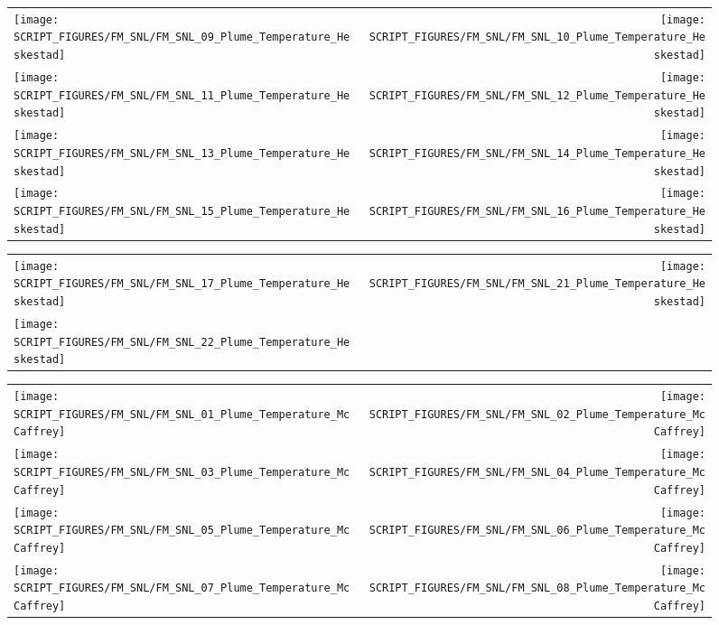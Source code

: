 \begin{figure}[!ht]
\begin{tabular*}{\textwidth}{l@{\extracolsep{\fill}}r}
\texttt{[image: SCRIPT\_FIGURES/FM\_SNL/FM\_SNL\_09\_Plume\_Temperature\_Heskestad]} &
\texttt{[image: SCRIPT\_FIGURES/FM\_SNL/FM\_SNL\_10\_Plume\_Temperature\_Heskestad]} \\
\texttt{[image: SCRIPT\_FIGURES/FM\_SNL/FM\_SNL\_11\_Plume\_Temperature\_Heskestad]} &
\texttt{[image: SCRIPT\_FIGURES/FM\_SNL/FM\_SNL\_12\_Plume\_Temperature\_Heskestad]} \\
\texttt{[image: SCRIPT\_FIGURES/FM\_SNL/FM\_SNL\_13\_Plume\_Temperature\_Heskestad]} &
\texttt{[image: SCRIPT\_FIGURES/FM\_SNL/FM\_SNL\_14\_Plume\_Temperature\_Heskestad]} \\
\texttt{[image: SCRIPT\_FIGURES/FM\_SNL/FM\_SNL\_15\_Plume\_Temperature\_Heskestad]} &
\texttt{[image: SCRIPT\_FIGURES/FM\_SNL/FM\_SNL\_16\_Plume\_Temperature\_Heskestad]}
\end{tabular*}
\end{figure}

\begin{figure}[!ht]
\begin{tabular*}{\textwidth}{l@{\extracolsep{\fill}}r}
\texttt{[image: SCRIPT\_FIGURES/FM\_SNL/FM\_SNL\_17\_Plume\_Temperature\_Heskestad]} &
\texttt{[image: SCRIPT\_FIGURES/FM\_SNL/FM\_SNL\_21\_Plume\_Temperature\_Heskestad]} \\
\texttt{[image: SCRIPT\_FIGURES/FM\_SNL/FM\_SNL\_22\_Plume\_Temperature\_Heskestad]}
\end{tabular*}
\end{figure}

\begin{figure}[!ht]
\begin{tabular*}{\textwidth}{l@{\extracolsep{\fill}}r}
\texttt{[image: SCRIPT\_FIGURES/FM\_SNL/FM\_SNL\_01\_Plume\_Temperature\_McCaffrey]} &
\texttt{[image: SCRIPT\_FIGURES/FM\_SNL/FM\_SNL\_02\_Plume\_Temperature\_McCaffrey]} \\
\texttt{[image: SCRIPT\_FIGURES/FM\_SNL/FM\_SNL\_03\_Plume\_Temperature\_McCaffrey]} &
\texttt{[image: SCRIPT\_FIGURES/FM\_SNL/FM\_SNL\_04\_Plume\_Temperature\_McCaffrey]} \\
\texttt{[image: SCRIPT\_FIGURES/FM\_SNL/FM\_SNL\_05\_Plume\_Temperature\_McCaffrey]} &
\texttt{[image: SCRIPT\_FIGURES/FM\_SNL/FM\_SNL\_06\_Plume\_Temperature\_McCaffrey]} \\
\texttt{[image: SCRIPT\_FIGURES/FM\_SNL/FM\_SNL\_07\_Plume\_Temperature\_McCaffrey]} &
\texttt{[image: SCRIPT\_FIGURES/FM\_SNL/FM\_SNL\_08\_Plume\_Temperature\_McCaffrey]}
\end{tabular*}
\end{figure}


